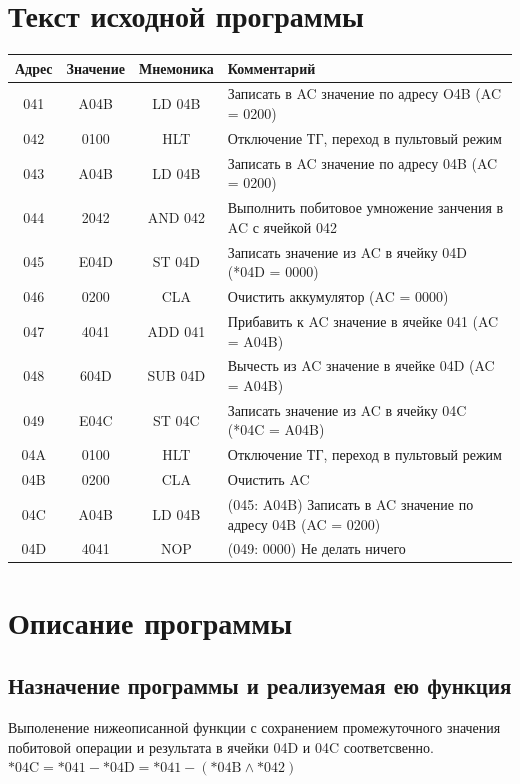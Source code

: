 \documentclass[11pt]{article}
\begin{document}
\section{Текст исходной программы}
\label{sec:org8cc7921}
\begin{center}
\begin{tabular}{|c|c|c|l|}
\hline
Адрес & Значение & Мнемоника & Комментарий\\
\hline
041 & A04B & LD 04B & Записать в AC значение по адресу O4B (AC = 0200)\\
042 & 0100 & HLT & Отключение ТГ, переход в пультовый режим\\
\hline
043 & A04B & LD 04B & Записать в AC значение по адресу 04B (AC = 0200)\\
044 & 2042 & AND 042 & Выполнить побитовое умножение занчения в AC с ячейкой 042\\
045 & E04D & ST 04D & Записать значение из AC в ячейку 04D  (*04D = 0000)\\
046 & 0200 & CLA & Очистить аккумулятор (AC = 0000)\\
047 & 4041 & ADD 041 & Прибавить к AC значение в ячейке 041 (AC = A04B)\\
048 & 604D & SUB 04D & Вычесть из AC значение в ячейке 04D (AC = A04B)\\
049 & E04C & ST 04C & Записать значение из AC в ячейку 04C (*04C = A04B)\\
04A & 0100 & HLT & Отключение ТГ, переход в пультовый режим\\
04B & 0200 & CLA & Очистить AC\\
04C & A04B & LD 04B & (045: A04B) Записать в AC значение по адресу 04B (AC = 0200)\\
04D & 4041 & NOP & (049: 0000) Не делать ничего\\
\hline
\end{tabular}
\end{center}

\section{Описание программы}
\label{sec:org8b50844}
\subsection{Назначение программы и реализуемая ею функция}
\label{sec:org3aaa963}
Выполенение нижеописанной функции с сохранением промежуточного значения побитовой операции и результата в ячейки 04D и 04C соответсвенно.\\
\(\text{*04C} = \text{*041} - \text{*04D} = \text{*041} - \left(\text{*04B} \mathbin{\land} \text{*042}\right)\)
\end{document}
